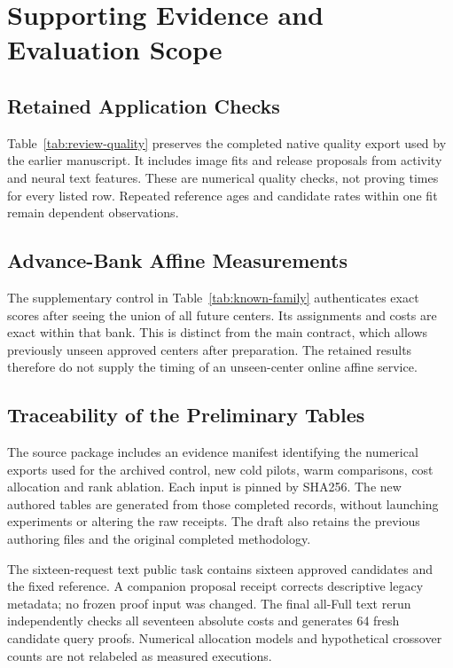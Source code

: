 \section{Supporting Evidence and Evaluation Scope}
\label{app:ccd-evidence}
\subsection{Retained Application Checks}
Table~\ref{tab:review-quality} preserves the completed native quality export
used by the earlier manuscript. It includes image fits and release proposals
from activity and neural text features. These are numerical quality checks,
not proving times for every listed row. Repeated reference ages and candidate
rates within one fit remain dependent observations.


\subsection{Advance-Bank Affine Measurements}
The supplementary control in Table~\ref{tab:known-family} authenticates exact
scores after seeing the union of all future centers. Its assignments and
costs are exact within that bank. This is distinct from the main contract,
which allows previously unseen approved centers after preparation. The
retained results therefore do not supply the timing of an unseen-center
online affine service.


\subsection{Traceability of the Preliminary Tables}
The source package includes an evidence manifest identifying the numerical
exports used for the archived control, new cold pilots, warm comparisons,
cost allocation and rank ablation. Each input is pinned by SHA256. The
new authored tables are generated from those completed records, without
launching experiments or altering the raw receipts. The draft also retains
the previous authoring files and the original completed methodology.

The sixteen-request text public task contains sixteen approved candidates and the fixed
reference. A companion proposal receipt corrects descriptive legacy
metadata; no frozen proof input was changed. The final all-Full text rerun
independently checks all seventeen absolute costs and generates 64 fresh
candidate query proofs. Numerical allocation models and hypothetical
crossover counts are not relabeled as measured executions.

